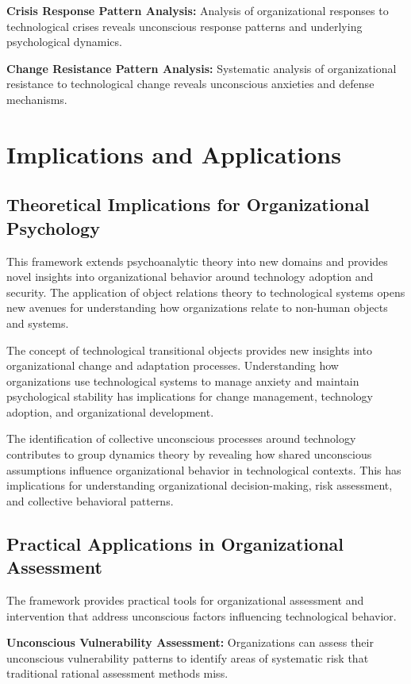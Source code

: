 \documentclass[10pt, twocolumn]{article}
\begin{document}
\textbf{Crisis Response Pattern Analysis:} Analysis of organizational responses to technological crises reveals unconscious response patterns and underlying psychological dynamics.

\textbf{Change Resistance Pattern Analysis:} Systematic analysis of organizational resistance to technological change reveals unconscious anxieties and defense mechanisms.

\section{Implications and Applications}

\subsection{Theoretical Implications for Organizational Psychology}

This framework extends psychoanalytic theory into new domains and provides novel insights into organizational behavior around technology adoption and security. The application of object relations theory to technological systems opens new avenues for understanding how organizations relate to non-human objects and systems.

The concept of technological transitional objects provides new insights into organizational change and adaptation processes. Understanding how organizations use technological systems to manage anxiety and maintain psychological stability has implications for change management, technology adoption, and organizational development.

The identification of collective unconscious processes around technology contributes to group dynamics theory by revealing how shared unconscious assumptions influence organizational behavior in technological contexts. This has implications for understanding organizational decision-making, risk assessment, and collective behavioral patterns.

\subsection{Practical Applications in Organizational Assessment}

The framework provides practical tools for organizational assessment and intervention that address unconscious factors influencing technological behavior.

\textbf{Unconscious Vulnerability Assessment:} Organizations can assess their unconscious vulnerability patterns to identify areas of systematic risk that traditional rational assessment methods miss.
\end{document}
